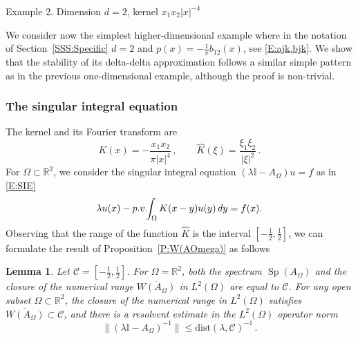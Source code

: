 \documentclass[12pt]{amsart}
\makeatletter
\def\subsection{\@startsection{section}{1}%
  \z@{1.2\linespacing\@plus\linespacing}{.5\linespacing}%
  {\normalfont\scshape\centering}}
\def\subsection{\@startsection{subsection}{2}%
  \z@{0.9\linespacing\@plus.7\linespacing}{-.5em}%
  {\normalfont\bfseries}}
\newtheorem{lemma}[theorem]{Lemma}
\theoremstyle{definition}
\theoremstyle{remark}
\numberwithin{equation}{section}
\newcommand{\pv}{\mathop{\rm p.v.}}
\newcommand\R{{\mathbb R}}
\newcommand\cC{{\mathcal{C}}}
\newcommand {\Id}{\mathbb I}
\newcommand{\dist}{\mathrm{dist}}
\newcommand{\Sp}{\mathop{\mathrm{Sp}}\nolimits}
\let\hat=\widehat
\makeatother
\begin{document}
\label{Ex:2}
\subsection{Example 2. Dimension $d=2$, kernel $x_{1}x_{2}|x|^{-4}$}\label{SS:2db12}\ 

We consider now the simplest higher-dimensional example where in the notation of Section~\ref{SSS:Specific} $d=2$ and $p(x)=-\frac1\pi b_{12}(x)$, see \eqref{E:ajk,bjk}. 
We show that the stability of its delta-delta approximation follows a similar simple pattern as in the previous one-dimensional example, although the proof is non-trivial. 

\subsubsection{The singular integral equation}
The kernel and its Fourier transform are
\begin{equation}
\label{E:KandKhatforb}
 K(x) = -\frac{x_{1}x_{2}}{\pi|x|^{4}}\,,\qquad
 \hat K(\xi) = \frac{\xi_{1}\xi_{2}}{|\xi|^{2}}\,.
\end{equation}
For $\Omega\subset\R^{2}$, we consider the singular integral equation 
$(\lambda \Id -A_{\Omega})u=f$ as in \eqref{E:SIE}
\begin{equation}
\label{E:IEEx2}
\lambda u(x) - \pv\!\! \int_{\Omega}K(x-y) u(y)\,dy = f(x).
\end{equation}
Observing that the range of the function $\hat K$ is the interval 
$[-\frac12,\frac12]$, we can formulate the result of Proposition~\ref{P:W(AOmega)} as follows
\begin{lemma}
 \label{L:AOmegaEx2}
Let $\cC=[-\frac12,\frac12]$. For $\Omega=\R^{2}$, both the spectrum $\Sp(A_{\Omega})$ and the closure of the numerical range $\overline{W(A_{\Omega})}$ in $L^{2}(\Omega)$ are equal to $\cC$. 
For any open subset $\Omega\subset\R^{2}$, the closure of the numerical range 
in $L^{2}(\Omega)$ satisfies $\overline{W(A_{\Omega})}\subset\cC$, and there is a resolvent estimate in the $L^{2}(\Omega)$ operator norm
\begin{equation}
\label{E:resAOmega2DEx2}
 \|(\lambda\Id-A_{\Omega})^{-1}\| \le \dist(\lambda,\cC)^{-1}\,.
\end{equation}
\end{lemma}

\end{document}
